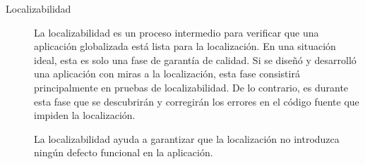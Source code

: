 \begin{description}
\item [Localizabilidad] La localizabilidad es un proceso intermedio para
    verificar que una aplicación globalizada está lista para la localización.
    En una situación ideal, esta es solo una fase de garantía de calidad. Si se
    diseñó y desarrolló una aplicación con miras a la localización, esta fase
    consistirá principalmente en pruebas de localizabilidad. De lo contrario, es
    durante esta fase que se descubrirán y corregirán los errores en el código
    fuente que impiden la localización.

    La localizabilidad ayuda a garantizar que la localización no introduzca
    ningún defecto funcional en la aplicación\cite{Moura}.
\end{description}

